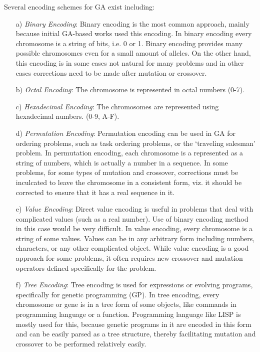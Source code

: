 \documentclass[journal]{IEEEtran}
\begin{document}
\vspace{2mm}
Several encoding schemes for GA exist including:

\begin{enumerate}

\item[a)] \emph{Binary Encoding}: Binary encoding is the most common approach, mainly because initial GA-based works used this encoding. In binary encoding every chromosome is a string of bits, i.e. 0 or 1. Binary encoding provides many possible chromosomes even for a small amount of alleles. On the other hand, this encoding is in some cases not natural for many problems and in other cases corrections need to be made after mutation or crossover.

\item[b)] \emph{Octal Encoding}: The chromosome is represented in octal numbers (0-7).

\item[c)] \emph{Hexadecimal Encoding}: The chromosomes are represented using hexadecimal numbers. (0-9, A-F).

\item[d)] \emph{Permutation Encoding}: Permutation encoding can be used in GA for ordering problems, such as task ordering problems, or the `traveling salesman' problem. In permutation encoding, each chromosome is a represented as a string of numbers, which is actually a number in a sequence. In some problems, for some types of mutation and crossover, corrections must be inculcated to leave the chromosome in a consistent form, viz. it should be corrected to ensure that it has a real sequence in it.

\item[e)] \emph{Value Encoding}: Direct value encoding is useful in problems that deal with complicated values (such as a real number). Use of binary encoding method in this case would be very difficult. In value encoding, every chromosome is a string of some values. Values can be in any arbitrary form including numbers, characters, or any other complicated object. While value encoding is a good approach for some problems, it often requires  
new crossover and mutation operators defined specifically for the problem. 

\item[f)]\emph{Tree Encoding}: Tree encoding is used for expressions or evolving programs, specifically for genetic programming (GP). In tree encoding, every chromosome or gene is in a tree form of some objects, like commands in programming language or a function. Programming language like LISP is mostly used for this, because genetic programs in it are encoded in this form and can be easily parsed as a tree structure, thereby facilitating mutation and crossover to be performed relatively easily.

\end{enumerate}
\end{document}
